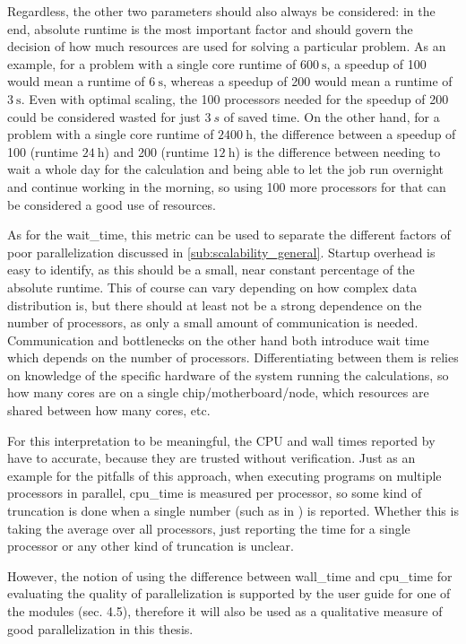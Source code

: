 \documentclass[main.tex]{subfiles}
\begin{document}
Regardless, the other two parameters should also always be considered: in the end, absolute runtime is the most important factor and should govern the decision of how much resources are used for solving a particular problem.
As an example, for a problem with a single core runtime of \(\SI{600}{\s}\), a speedup of 100 would mean a runtime of \(\SI{6}{\s}\), whereas a speedup of 200 would mean a runtime of \(\SI{3}{\s}\).
Even with optimal scaling, the 100 processors needed for the speedup of 200 could be considered wasted for just \(\SI{3}{s}\) of saved time.
On the other hand, for a problem with a single core runtime of \(\SI{2400}{\hour}\), the difference between a speedup of 100 (runtime \(\SI{24}{\hour}\)) and 200 (runtime \(\SI{12}{\hour}\)) is the difference between needing to wait a whole day for the calculation and being able to let the job run overnight and continue working in the morning, so using 100 more processors for that can be considered a good use of resources.

As for the \gls{wait_time}, this metric can be used to separate the different factors of poor parallelization discussed in \ref{sub:scalability_general}.
Startup overhead is easy to identify, as this should be a small, near constant percentage of the absolute runtime.
This of course can vary depending on how complex data distribution is, but there should at least not be a strong dependence on the number of processors, as only a small amount of communication is needed.
Communication and bottlenecks on the other hand both introduce wait time which depends on the number of processors.
Differentiating between them is relies on knowledge of the specific hardware of the system running the calculations, so how many cores are on a single chip/motherboard/node, which resources are shared between how many cores, etc.

For this interpretation to be meaningful, the CPU and wall times reported by \QE have to accurate, because they are trusted without verification.
Just as an example for the pitfalls of this approach, when executing programs on multiple processors in parallel, \gls{cpu_time} is measured per processor, so some kind of truncation is done when a single number (such as in \QE) is reported.
Whether this is taking the average over all processors, just reporting the time for a single processor or any other kind of truncation is unclear.

However, the notion of using the difference between \gls{wall_time} and \gls{cpu_time} for evaluating the quality of parallelization is supported by the user guide for one of the \QE modules \cite{noauthor_pwscf_nodate} (sec. 4.5), therefore it will also be used as a qualitative measure of good parallelization in this thesis.
\end{document}
